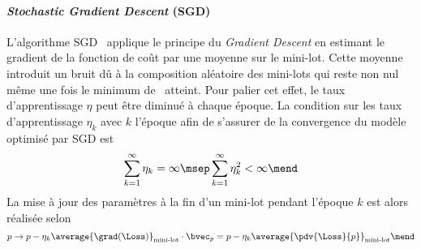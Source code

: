 \paragraph{\emph{Stochastic Gradient Descent} (SGD)}
L'algorithme SGD~\cite{SGD} applique le principe du \emph{Gradient Descent} en estimant le gradient de la fonction de coût par une moyenne sur le mini-lot.
Cette moyenne introduit un bruit dû à la composition aléatoire des mini-lots
qui reste non nul même une fois le minimum de \Loss\ atteint.
Pour palier cet effet, le taux d'apprentissage $\eta$ peut être diminué à chaque époque.
La condition sur les taux d'apprentissage $\eta_k$ avec $k$ l'époque afin de s'assurer de la convergence du modèle optimisé par SGD est~\cite{DNN}
\begin{equation}
\sum_{k=1}^\infty \eta_k = \infty
\msep
\sum_{k=1}^\infty \eta_k^2 < \infty
\mend
\end{equation}
La mise à jour des paramètres à la fin d'un mini-lot pendant l'époque $k$ est alors réalisée selon
\begin{equation}
p \to p - \eta_k \average{\grad(\Loss)}_\text{mini-lot} \cdot \bvec_p = p - \eta_k \average{\pdv{\Loss}{p}}_\text{mini-lot}
\mend
\end{equation}
